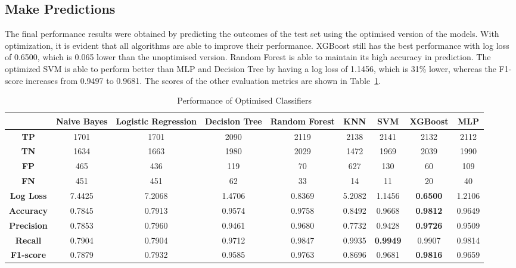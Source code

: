 \documentclass[conference]{IEEEtran}
\begin{document}
\subsection{Make Predictions}
The final performance results were obtained by predicting the outcomes of the test set using the optimised version of the models. With optimization, it is evident that all algorithms are able to improve their performance. XGBoost still has the best performance with log loss of 0.6500, which is 0.065 lower than the unoptimised version. Random Forest is able to maintain its high accuracy in prediction. The optimized SVM is able to perform better than MLP and Decision Tree by having a log loss of 1.1456, which is 31\% lower, whereas the F1-score increases from 0.9497 to 0.9681. The scores of the other evaluation metrics are shown in Table~\ref{table:optimised_results}.

\begin{table}[htbp]
    \renewcommand{\arraystretch}{1.5}
    \caption{Performance of Optimised Classifiers}
    \label{table:optimised_results}
    \centering
    \setlength{\tabcolsep}{9pt}
    \begin{tabular}{c c c c c c c c c}
        \hline 
        \bfseries  & \bfseries Naive Bayes & \bfseries Logistic Regression & \bfseries Decision Tree & \bfseries Random Forest & \bfseries KNN & \bfseries SVM & \bfseries XGBoost & \bfseries MLP \\
        \hline  
        \textbf{TP} & 1701 & 1701 & 2090 & 2119 & 2138 & 2141 & 2132 & 2112\\
        \textbf{TN} & 1634 & 1663 & 1980 & 2029 & 1472 & 1969 & 2039 & 1990 \\
        \textbf{FP} & 465 & 436 & 119 & 70 & 627 & 130 & 60 & 109 \\
        \textbf{FN} & 451 & 451  &  62 &  33 & 14 & 11 & 20 & 40 \\
        \hline 
        \textbf{Log Loss} & 7.4425 & 7.2068 & 1.4706 & 0.8369 & 5.2082 & 1.1456 & \textbf{0.6500} & 1.2106 \\ 
        \textbf{Accuracy} & 0.7845 & 0.7913 & 0.9574 & 0.9758 & 0.8492 & 0.9668 & \textbf{0.9812} & 0.9649 \\ 
        \textbf{Precision} & 0.7853 &  0.7960 &  0.9461  & 0.9680 & 0.7732  &  0.9428 & \textbf{0.9726} & 0.9509 \\ 
        \textbf{Recall} & 0.7904 &  0.7904 &  0.9712  &   0.9847  & 0.9935 & \textbf{0.9949} & 0.9907  & 0.9814 \\ 
        \textbf{F1-score} & 0.7879 & 0.7932 & 0.9585 & 0.9763 & 0.8696 & 0.9681 & \textbf{0.9816} & 0.9659 \\
    \hline
    \end{tabular}
\end{table}
             
\end{document}
